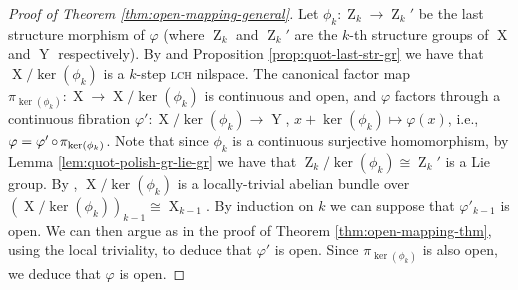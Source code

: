 \documentclass[a4paper,12pt,reqno]{amsart}
\theoremstyle{definition}
\def\to{\rightarrow}
\DeclareMathOperator{\ab}{Z}
\DeclareMathOperator{\ns}{X}
\DeclareMathOperator{\nss}{Y}
\DeclareMathOperator{\co}{\circ\hspace{-0.02 cm}}
\begin{document}
\begin{proof}[Proof of Theorem \ref{thm:open-mapping-general}]
Let $\phi_k:\ab_k\to\ab_k'$ be the last structure morphism of $\varphi$ (where $\ab_k$ and $\ab_k'$ are the $k$-th structure groups of $\ns$ and $\nss$ respectively). By \cite[Proposition A.19]{CGSS-p-hom} and Proposition \ref{prop:quot-last-str-gr} we have that $\ns/\ker(\phi_k)$ is a $k$-step \textsc{lch} nilspace. The canonical factor map $\pi_{\ker(\phi_k)}:\ns\to\ns/\ker(\phi_k)$ is continuous and open, and $\varphi$ factors through a continuous fibration $\varphi':\ns/\ker(\phi_k)\to\nss$, $x+\ker(\phi_k)\mapsto \varphi(x)$, i.e., $\varphi = \varphi'\co \pi_{\ker(\phi_k)}$. Note that since $\phi_k$ is a continuous  surjective homomorphism, by Lemma \ref{lem:quot-polish-gr-lie-gr} we have that $\ab_k/\ker(\phi_k)\cong \ab_k'$ is a Lie group. By \cite[Theorem 2.3.3]{P61}, $\ns/\ker(\phi_k)$ is a locally-trivial abelian bundle over $(\ns/\ker(\phi_k))_{k-1}\cong \ns_{k-1}$. By induction on $k$ we can suppose that $\varphi'_{k-1}$ is open. We can then argue as in the proof of Theorem \ref{thm:open-mapping-thm}, using the local triviality, to deduce that $\varphi'$ is open. Since $\pi_{\ker(\phi_k)}$ is also open, we deduce that $\varphi$ is open.
\end{proof}
\end{document}
